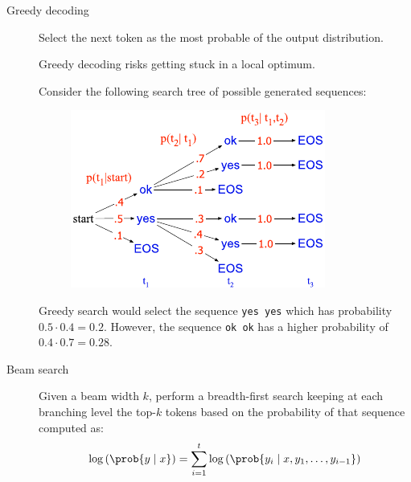 \begin{description}
    \item[Greedy decoding] 
        Select the next token as the most probable of the output distribution.

        \begin{remark}
            Greedy decoding risks getting stuck in a local optimum.

            \indenttbox
            \begin{example}
                Consider the following search tree of possible generated sequences:

                \begin{minipage}{0.35\linewidth}
                    \begin{figure}[H]
                        \centering
                        \includegraphics[width=\linewidth]{./img/_greedy_decoding_local_minimum.pdf}
                    \end{figure}
                \end{minipage}
                \hfill
                \begin{minipage}[b]{0.6\linewidth}
                    Greedy search would select the sequence \texttt{yes yes} which has probability $0.5 \cdot 0.4 = 0.2$. However, the sequence \texttt{ok ok} has a higher probability of $0.4 \cdot 0.7 = 0.28$.
                \end{minipage}
            \end{example}
        \end{remark}

    \item[Beam search] 
        Given a beam width $k$, perform a breadth-first search keeping at each branching level the top-$k$ tokens based on the probability of that sequence computed as:
        \[ \log\left( \prob{y \mid x} \right) = \sum_{i=1}^{t} \log\left( \prob{ y_i \mid x, y_1, \dots, y_{i-1} } \right) \]


\end{description}
